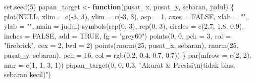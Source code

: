 \documentclass[
  indonesian,
  letterpaper,
]{book}
\newenvironment{Shaded}{\begin{snugshade}}{\end{snugshade}}
\newcommand{\AttributeTok}[1]{\textcolor[rgb]{0.40,0.45,0.13}{#1}}
\newcommand{\ConstantTok}[1]{\textcolor[rgb]{0.56,0.35,0.01}{#1}}
\newcommand{\ControlFlowTok}[1]{\textcolor[rgb]{0.00,0.23,0.31}{\textbf{#1}}}
\newcommand{\DecValTok}[1]{\textcolor[rgb]{0.68,0.00,0.00}{#1}}
\newcommand{\FloatTok}[1]{\textcolor[rgb]{0.68,0.00,0.00}{#1}}
\newcommand{\FunctionTok}[1]{\textcolor[rgb]{0.28,0.35,0.67}{#1}}
\newcommand{\NormalTok}[1]{\textcolor[rgb]{0.00,0.23,0.31}{#1}}
\newcommand{\OtherTok}[1]{\textcolor[rgb]{0.00,0.23,0.31}{#1}}
\newcommand{\SpecialCharTok}[1]{\textcolor[rgb]{0.37,0.37,0.37}{#1}}
\newcommand{\StringTok}[1]{\textcolor[rgb]{0.13,0.47,0.30}{#1}}
\begin{document}
\begin{Shaded}
\begin{Highlighting}[]
\FunctionTok{set.seed}\NormalTok{(}\DecValTok{5}\NormalTok{)}
\NormalTok{papan\_target }\OtherTok{\textless{}{-}} \ControlFlowTok{function}\NormalTok{(pusat\_x, pusat\_y, sebaran, judul) \{}
\FunctionTok{plot}\NormalTok{(}\ConstantTok{NULL}\NormalTok{, }\AttributeTok{xlim =} \FunctionTok{c}\NormalTok{(}\SpecialCharTok{{-}}\DecValTok{3}\NormalTok{, }\DecValTok{3}\NormalTok{), }\AttributeTok{ylim =} \FunctionTok{c}\NormalTok{(}\SpecialCharTok{{-}}\DecValTok{3}\NormalTok{, }\DecValTok{3}\NormalTok{), }\AttributeTok{asp =} \DecValTok{1}\NormalTok{, }\AttributeTok{axes =} \ConstantTok{FALSE}\NormalTok{,}
\AttributeTok{xlab =} \StringTok{""}\NormalTok{, }\AttributeTok{ylab =} \StringTok{""}\NormalTok{, }\AttributeTok{main =}\NormalTok{ judul)}
\FunctionTok{symbols}\NormalTok{(}\FunctionTok{rep}\NormalTok{(}\DecValTok{0}\NormalTok{, }\DecValTok{3}\NormalTok{), }\FunctionTok{rep}\NormalTok{(}\DecValTok{0}\NormalTok{, }\DecValTok{3}\NormalTok{), }\AttributeTok{circles =} \FunctionTok{c}\NormalTok{(}\FloatTok{2.7}\NormalTok{, }\FloatTok{1.8}\NormalTok{, }\FloatTok{0.9}\NormalTok{), }\AttributeTok{inches =} \ConstantTok{FALSE}\NormalTok{,}
\AttributeTok{add =} \ConstantTok{TRUE}\NormalTok{, }\AttributeTok{fg =} \StringTok{"grey60"}\NormalTok{)}
\FunctionTok{points}\NormalTok{(}\DecValTok{0}\NormalTok{, }\DecValTok{0}\NormalTok{, }\AttributeTok{pch =} \DecValTok{3}\NormalTok{, }\AttributeTok{col =} \StringTok{"firebrick"}\NormalTok{, }\AttributeTok{cex =} \DecValTok{2}\NormalTok{, }\AttributeTok{lwd =} \DecValTok{2}\NormalTok{)}
\FunctionTok{points}\NormalTok{(}\FunctionTok{rnorm}\NormalTok{(}\DecValTok{25}\NormalTok{, pusat\_x, sebaran), }\FunctionTok{rnorm}\NormalTok{(}\DecValTok{25}\NormalTok{, pusat\_y, sebaran),}
\AttributeTok{pch =} \DecValTok{16}\NormalTok{, }\AttributeTok{col =} \FunctionTok{rgb}\NormalTok{(}\FloatTok{0.2}\NormalTok{, }\FloatTok{0.4}\NormalTok{, }\FloatTok{0.7}\NormalTok{, }\FloatTok{0.7}\NormalTok{))}
\NormalTok{\}}
\FunctionTok{par}\NormalTok{(}\AttributeTok{mfrow =} \FunctionTok{c}\NormalTok{(}\DecValTok{2}\NormalTok{, }\DecValTok{2}\NormalTok{), }\AttributeTok{mar =} \FunctionTok{c}\NormalTok{(}\DecValTok{1}\NormalTok{, }\DecValTok{1}\NormalTok{, }\DecValTok{3}\NormalTok{, }\DecValTok{1}\NormalTok{))}
\FunctionTok{papan\_target}\NormalTok{(}\DecValTok{0}\NormalTok{, }\DecValTok{0}\NormalTok{, }\FloatTok{0.3}\NormalTok{, }\StringTok{"Akurat \& Presisi}\SpecialCharTok{\textbackslash{}n}\StringTok{(tidak bias, sebaran kecil)"}\NormalTok{)}

\end{Highlighting}
\end{Shaded}
\end{document}
